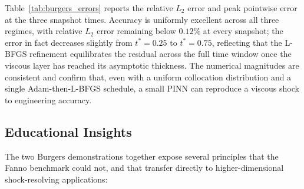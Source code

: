 \documentclass[11pt,a4paper]{report}
\begin{document}
Table~\ref{tab:burgers_errors} reports the relative $L_{2}$ error and peak pointwise error at the three snapshot times. Accuracy is uniformly excellent across all three regimes, with relative $L_{2}$ error remaining below $0.12\%$ at every snapshot; the error in fact decreases slightly from $t^{*} = 0.25$ to $t^{*} = 0.75$, reflecting that the L-BFGS refinement equilibrates the residual across the full time window once the viscous layer has reached its asymptotic thickness. The numerical magnitudes are consistent and confirm that, even with a uniform collocation distribution and a single Adam-then-L-BFGS schedule, a small PINN can reproduce a viscous shock to engineering accuracy.

\subsection{Educational Insights}

The two Burgers demonstrations together expose several principles that the Fanno benchmark could not, and that transfer directly to higher-dimensional shock-resolving applications:
\end{document}
